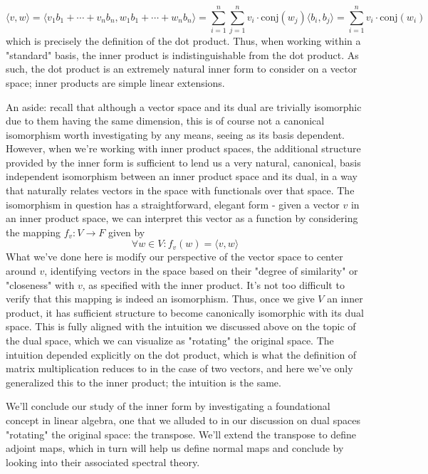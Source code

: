 \documentclass{article}
\newcommand{\n}{\leavevmode \newline}
\newcommand{\nn}{\leavevmode \newline \newline}
\begin{document}
    $$ \langle v, w \rangle = \langle v_1 b_1 + \cdots + v_n b_n, w_1 b_1 + \cdots + w_n b_n \rangle = \sum_{i = 1}^n \sum_{j = 1}^n v_i \cdot \text{conj}(w_j) \langle b_i, b_j \rangle = \sum_{i = 1}^n v_i \cdot \text{conj}(w_i) $$
which is precisely the definition of the dot product. Thus, when working within a "standard" basis, the inner product is indistinguishable from the dot product. As such, the dot product is an extremely natural inner form to consider on a vector space; inner products are simple linear extensions.
\n
\begin{adjustwidth}{1cm}{1cm}

    An aside: recall that although a vector space and its dual are trivially isomorphic due to them having the same dimension, this is of course not a canonical isomorphism worth investigating by any means, seeing as its basis dependent. However, when we're working with inner product spaces, the additional structure provided by the inner form is sufficient to lend us a very natural, canonical, basis independent isomorphism between an inner product space and its dual, in a way that naturally relates vectors in the space with functionals over that space.
    \nn
    The isomorphism in question has a straightforward, elegant form - given a vector $ v $ in an inner product space, we can interpret this vector as a function by considering the mapping $ f_v: V \rightarrow F $ given by
        $$ \forall w \in V: f_v(w) = \langle v, w \rangle $$
    What we've done here is modify our perspective of the vector space to center around $ v $, identifying vectors in the space based on their "degree of similarity" or "closeness" with $ v $, as specified with the inner product. It's not too difficult to verify that this mapping is indeed an isomorphism. Thus, once we give $ V $ an inner product, it has sufficient structure to become canonically isomorphic with its dual space. This is fully aligned with the intuition we discussed above on the topic of the dual space, which we can visualize as "rotating" the original space. The intuition depended explicitly on the dot product, which is what the definition of matrix multiplication reduces to in the case of two vectors, and here we've only generalized this to the inner product; the intuition is the same.

\end{adjustwidth}
\n
We'll conclude our study of the inner form by investigating a foundational concept in linear algebra, one that we alluded to in our discussion on dual spaces "rotating" the original space: the transpose. We'll extend the transpose to define adjoint maps, which in turn will help us define normal maps and conclude by looking into their associated spectral theory.
\end{document}
